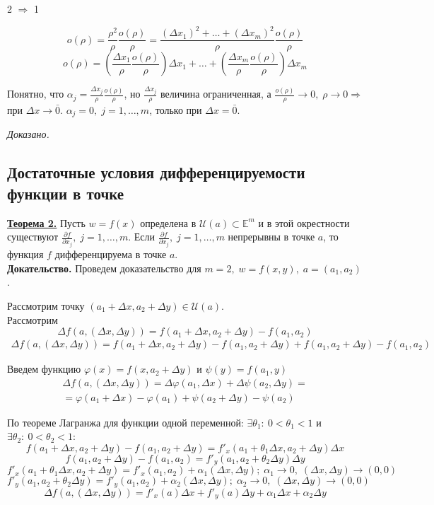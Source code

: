 \documentclass[a4paper,12pt]{article} %
\begin{document}
2 $\Rightarrow$ 1 

\[o(\rho) = \frac{\rho^2}{\rho} \frac{o(\rho)}{\rho} = \frac{(\Delta x_1)^2 + \ldots + (\Delta x_m)^2}{\rho} \frac{o(\rho)}{\rho}\]
\[o(\rho) = (\frac{\Delta x_1}{\rho}\frac{o(\rho)}{\rho})\Delta x_1 + \ldots + (\frac{\Delta x_m}{\rho}\frac{o(\rho)}{\rho})\Delta x_m \]

Понятно, что $\alpha_j = \frac{\Delta x_j}{\rho}\frac{o(\rho)}{\rho}$, но $\frac {\Delta x_j}{\rho}$ величина ограниченная, а $\frac {o(\rho)}{\rho} \to 0, \; \rho \to 0 \Rightarrow $ при $\Delta x \to \bar 0$.
$\alpha_j = 0, \; j = 1, \ldots, m$, только при $\Delta x = \bar0$.

\textit{Доказано.}
	
	
 \subsection{Достаточные условия дифференцируемости функции в точке}
 
 \underline{\textbf{Теорема 2.}} Пусть $w = f(x)$ определена в $\mathscr{U}(a) \subset \mathds{E}^m$
 и в этой окрестности существуют $\frac{\partial f}{\partial x_j}, \; j = 1, \ldots, m$. 
 Если  $\frac{\partial f}{\partial x_j}, \; j = 1, \ldots, m$ непрерывны в точке $a$, то функция $f$ дифференцируема в точке $a$.\\
 
 \textbf{Докательство.} Проведем доказательство для $m = 2, \; w = f(x, y), \; a = (a_1, a_2)$.
 
 Рассмотрим точку $(a_1 + \Delta x, a_2 + \Delta y) \in \mathscr{U}(a)$.\\
 
 Рассмотрим 
 \[\Delta f(a, (\Delta x, \Delta y)) = f(a_1 + \Delta x, a_2 + \Delta y) - f(a_1, a_2)\]
 \begin{multline*}
 \Delta f(a, (\Delta x, \Delta y)) = f(a_1 + \Delta x, a_2 + \Delta y)
 - f(a_1, a_2 + \Delta y) + f(a_1, a_2 + \Delta y) - f(a_1, a_2)
 \end{multline*}
 
 Введем функцию $\varphi(x) = f(x, a_2 + \Delta y)$ и $\psi(y) = f(a_1, y)$
 \begin{multline*}
 \Delta f(a, (\Delta x, \Delta y)) = \Delta\varphi(a_1, \Delta x) + \Delta\psi(a_2, \Delta y) = \\
 = \varphi(a_1 + \Delta x) - \varphi(a_1) + \psi(a_2 + \Delta y) - \psi(a_2)
 \end{multline*}
 
 По теореме Лагранжа для функции одной переменной: $\exists \theta_1: ~0 < \theta_1 < 1$ и $\exists \theta_2: ~ 0 < \theta_2 < 1:$
 \[f(a_1 + \Delta x, a_2 + \Delta y) - f(a_1, a_2 + \Delta y) = f'_x(a_1 + \theta_1 \Delta x, a_2 + \Delta y)\Delta x\]
 \[f(a_1, a_2 + \Delta y) - f(a_1, a_2) = f'_y(a_1, a_2 + \theta_2 \Delta y)\Delta y\]
 \[f'_x(a_1 + \theta_1\Delta x, a_2 + \Delta y) = f'_x(a_1, a_2) + \alpha_1(\Delta x, \Delta y); \; \alpha_1 \to 0, \; (\Delta x, \Delta y) \to (0, 0)\]
  \[f'_y(a_1, a_2 + \theta_2 \Delta y) = f'_y(a_1, a_2) + \alpha_2(\Delta x, \Delta y); \; \alpha_2 \to 0, \; (\Delta x, \Delta y) \to (0, 0)\]
  \[\Delta f(a, (\Delta x, \Delta y)) = f'_x(a)\Delta x +f'_y(a)\Delta y + \alpha_1\Delta x + \alpha_2 \Delta y\]
  
\end{document}
